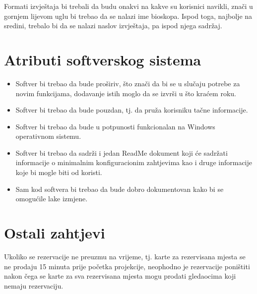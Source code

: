 Formati izvještaja bi trebali da budu onakvi na kakve su korisnici navikli, znači u
gornjem lijevom uglu bi trebao da se nalazi ime bioskopa. Ispod toga, najbolje na sredini, trebalo bi da se nalazi
naslov izvještaja, pa ispod njega sadržaj.

\section{Atributi softverskog sistema}
\begin{itemize}
\item Softver bi trebao da bude proširiv, što znači da bi se u slučaju potrebe za novim funkcijama, dodavanje 
istih moglo da se izvrši u što kraćem roku.
\item Softver bi trebao da bude pouzdan, tj. da pruža korisniku tačne informacije.
\item Softver bi trebao da bude u potpunosti funkcionalan na Windows operativnom sistemu.
\item Softver bi trebao da sadrži i jedan ReadMe dokument koji će sadržati informacije o minimalnim konfiguracionim 
zahtjevima kao i druge informacije koje bi mogle biti od koristi.
\item Sam kod softvera bi trebao da bude dobro dokumentovan kako bi se omogućile lake izmjene.
\end{itemize}

\section{Ostali zahtjevi}
Ukoliko se rezervacije ne preuzmu na vrijeme, tj. karte za rezervisana mjesta se ne prodaju 15 minuta prije početka projekcije, neophodno je rezervacije poništiti nakon čega se karte za sva rezervisana mjesta mogu prodati gledaocima koji nemaju rezervaciju.